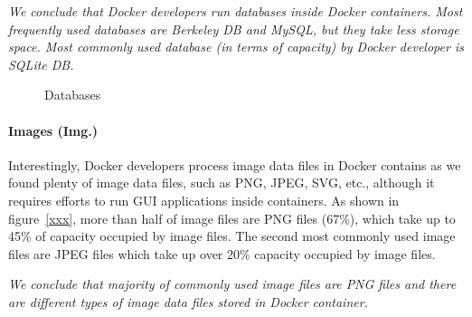 \textit{We conclude that Docker developers run databases inside Docker containers. Most frequently used databases are Berkeley DB and MySQL, but they take less storage space. Most commonly used database (in terms of capacity) by Docker developer is SQLite DB.}

\begin{figure}
	\centering
	\caption{Databases}
	\label{fig:arc-db}
\end{figure} 

\paragraph{Images (Img.)}

Interestingly, Docker developers process image data files in Docker contains as we found plenty of image data files, such as PNG, JPEG, SVG, etc., although it requires efforts to run GUI applications inside containers.
As shown in figure~\ref{xxx}, more than half of image files are PNG files (67\%), which take up to 45\% of capacity occupied by image files. The second most commonly used image files are JPEG files which take up over 20\% capacity occupied by image files.

\textit{We conclude that majority of commonly used image files are PNG files and there are different types of image data files stored in Docker container.}

